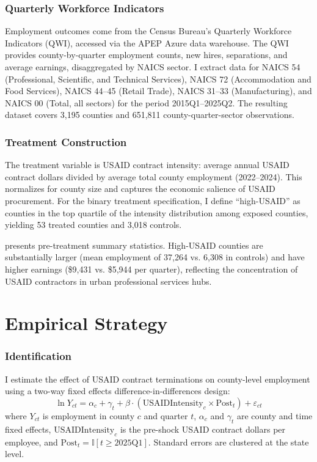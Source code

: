 \documentclass[12pt]{article}
\newcommand{\ind}{\mathbb{I}}
\begin{document}
\subsubsection*{Quarterly Workforce Indicators} Employment outcomes come from the Census Bureau's Quarterly Workforce Indicators (QWI), accessed via the APEP Azure data warehouse. The QWI provides county-by-quarter employment counts, new hires, separations, and average earnings, disaggregated by NAICS sector. I extract data for NAICS 54 (Professional, Scientific, and Technical Services), NAICS 72 (Accommodation and Food Services), NAICS 44--45 (Retail Trade), NAICS 31--33 (Manufacturing), and NAICS 00 (Total, all sectors) for the period 2015Q1--2025Q2. The resulting dataset covers 3,195 counties and 651,811 county-quarter-sector observations.

\subsubsection*{Treatment Construction} The treatment variable is USAID contract intensity: average annual USAID contract dollars divided by average total county employment (2022--2024). This normalizes for county size and captures the economic salience of USAID procurement. For the binary treatment specification, I define ``high-USAID'' as counties in the top quartile of the intensity distribution among exposed counties, yielding 53 treated counties and 3,018 controls.



 presents pre-treatment summary statistics. High-USAID counties are substantially larger (mean employment of 37,264 vs. 6,308 in controls) and have higher earnings (\$9,431 vs. \$5,944 per quarter), reflecting the concentration of USAID contractors in urban professional services hubs.


\section{Empirical Strategy}
\label{sec:strategy}

\subsubsection*{Identification} I estimate the effect of USAID contract terminations on county-level employment using a two-way fixed effects difference-in-differences design:
\begin{equation}
\ln Y_{ct} = \alpha_c + \gamma_t + \beta \cdot (\text{USAIDIntensity}_c \times \text{Post}_t) + \varepsilon_{ct}
\label{eq:main}
\end{equation}
where $Y_{ct}$ is employment in county $c$ and quarter $t$, $\alpha_c$ and $\gamma_t$ are county and time fixed effects, $\text{USAIDIntensity}_c$ is the pre-shock USAID contract dollars per employee, and $\text{Post}_t = \ind[t \geq 2025\text{Q1}]$. Standard errors are clustered at the state level.
\end{document}
